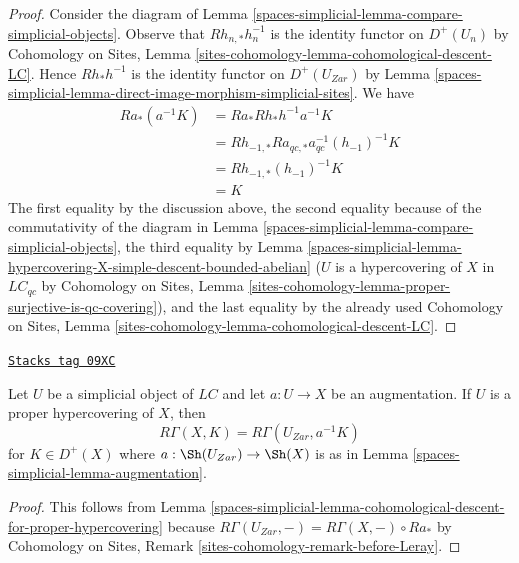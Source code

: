 \begin{proof}
Consider the diagram of Lemma \ref{spaces-simplicial-lemma-compare-simplicial-objects}.
Observe that $Rh_{n, *}h_n^{-1}$ is the identity functor
on $D^+(U_n)$ by Cohomology on Sites, Lemma
\ref{sites-cohomology-lemma-cohomological-descent-LC}.
Hence $Rh_*h^{-1}$ is the identity functor on
$D^+(U_{Zar})$ by
Lemma \ref{spaces-simplicial-lemma-direct-image-morphism-simplicial-sites}.
We have
\begin{align*}
Ra_*(a^{-1}K)
& =
Ra_*Rh_*h^{-1}a^{-1}K \\
& =
Rh_{-1, *}Ra_{qc, *}a_{qc}^{-1}(h_{-1})^{-1}K \\
& =
Rh_{-1, *}(h_{-1})^{-1}K \\
& =
K
\end{align*}
The first equality by the discussion above, the second equality
because of the commutativity of the diagram in
Lemma \ref{spaces-simplicial-lemma-compare-simplicial-objects}, the third equality by
Lemma \ref{spaces-simplicial-lemma-hypercovering-X-simple-descent-bounded-abelian}
($U$ is a hypercovering of $X$ in $\textit{LC}_{qc}$ by
Cohomology on Sites, Lemma
\ref{sites-cohomology-lemma-proper-surjective-is-qc-covering}),
and the last equality by the already used Cohomology on Sites, Lemma
\ref{sites-cohomology-lemma-cohomological-descent-LC}.
\end{proof}

\begin{lemma}
\label{spaces-simplicial-lemma-compute-via-proper-hypercovering}
\href{https://stacks.math.columbia.edu/tag/09XC}{\texttt{Stacks tag 09XC}}

Let $U$ be a simplicial object of $\textit{LC}$ and let $a : U \to X$
be an augmentation. If $U$ is a proper hypercovering of $X$, then
$$
R\Gamma(X, K) = R\Gamma(U_{Zar}, a^{-1}K)
$$
for $K \in D^+(X)$ where $a : \Sh(U_{Zar}) \to \Sh(X)$
is as in Lemma \ref{spaces-simplicial-lemma-augmentation}.
\end{lemma}

\begin{proof}
This follows from
Lemma \ref{spaces-simplicial-lemma-cohomological-descent-for-proper-hypercovering}
because $R\Gamma(U_{Zar}, -) = R\Gamma(X, -) \circ Ra_*$ by
Cohomology on Sites, Remark \ref{sites-cohomology-remark-before-Leray}.
\end{proof}


